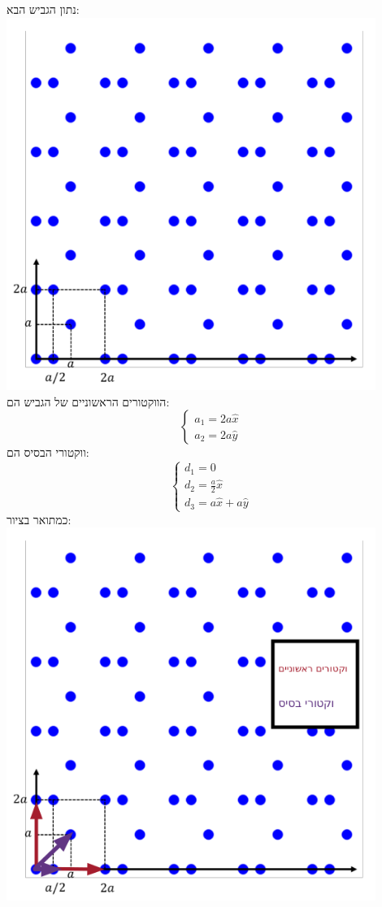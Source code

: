 \documentclass{article}
\begin{document}
\begin{Question}
נתון הגביש הבא:\\
\includegraphics[width=0.9\textwidth]{image/Q71.png}\\
הווקטורים הראשוניים של הגביש הם:
$$\begin{cases}
    a_{1}=2a\hat{x}\\
    a_{2}=2a\hat{y}
\end{cases}
$$
ווקטורי הבסיס הם:
$$\begin{cases}
    d_{1}=0\\
    d_{2}=\frac{a}{2}\hat{x}\\
    d_{3}=a\hat{x}+a\hat{y}
\end{cases}
$$ כמתואר בציור:\\
\includegraphics[width=0.9\textwidth]{image/Q72.png}\\

\end{Question}
\end{document}
